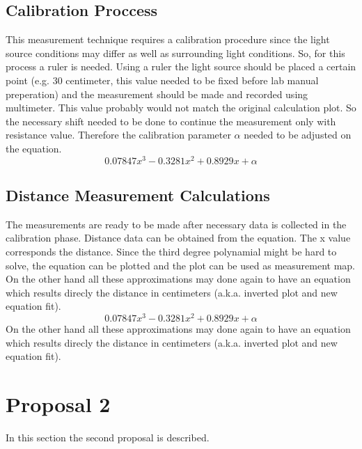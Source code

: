 \documentclass[letterpaper,12pt]{article}
\begin{document}
\subsection{Calibration Proccess}
This measurement technique requires a calibration procedure since the light source conditions may differ as well as surrounding light conditions. So, for this process a ruler is needed. Using a ruler the light source should be placed a certain point (e.g. 30 centimeter, this value needed to be fixed before lab manual preperation) and the measurement should be made and recorded using multimeter. This value probably would not match the original calculation plot. So the necessary shift needed to be done to continue the measurement only with resistance value. Therefore the calibration parameter \(\alpha\) needed to be adjusted on the equation.
\[0.07847 x^3 -0.3281 x^2 + 0.8929x + \alpha\]

\subsection{Distance Measurement Calculations}
The measurements are ready to be made after necessary data is collected in the calibration phase. Distance data can be obtained from the  equation. The x value corresponds the distance. Since the third degree polynamial might be hard to solve, the equation can be plotted and the plot can be used as measurement map. On the other hand all these approximations may done again to have an equation which results direcly the distance in centimeters (a.k.a. inverted plot and new equation fit).  
\[0.07847 x^3 -0.3281 x^2 + 0.8929x + \alpha\]
On the other hand all these approximations may done again to have an equation which results direcly the distance in centimeters (a.k.a. inverted plot and new equation fit). 


\section{Proposal 2}
In this section the second proposal is described.
\end{document}
